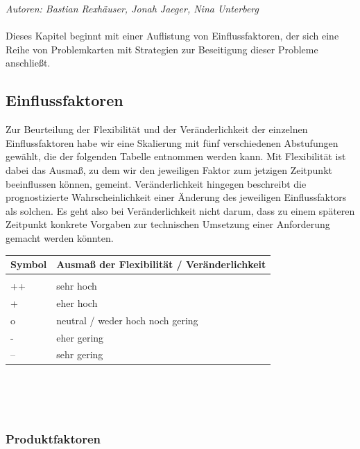 \documentclass[enabledeprecatedfontcommands,fontsize=11pt,paper=a4,twoside]{scrartcl}
\newcounter{one}
\begin{document}
	\emph{Autoren: Bastian Rexhäuser, Jonah Jaeger, Nina Unterberg}\\ \\
	Dieses Kapitel beginnt mit einer Auflistung von Einflussfaktoren, der sich eine Reihe von Problemkarten mit Strategien zur Beseitigung dieser Probleme anschließt.
	\subsection{Einflussfaktoren}
	\label{sec:einflussfaktoren}
	
	Zur Beurteilung der Flexibilität und der Veränderlichkeit der einzelnen Einflussfaktoren habe wir eine Skalierung mit fünf verschiedenen Abstufungen gewählt, die der folgenden Tabelle entnommen werden kann. Mit Flexibilität ist dabei das Ausmaß, zu dem wir den jeweiligen Faktor zum jetzigen Zeitpunkt beeinflussen können, gemeint. Veränderlichkeit hingegen beschreibt die prognostizierte Wahrscheinlichkeit einer Änderung des jeweiligen Einflussfaktors als solchen. Es geht also bei Veränderlichkeit nicht darum, dass zu einem späteren Zeitpunkt konkrete Vorgaben zur technischen Umsetzung einer Anforderung gemacht werden könnten. \\
	
	\begin{tabular}{p{2cm}p{8cm}}
		Symbol & Ausmaß der Flexibilität / Veränderlichkeit \\ \hline \\
		++ & sehr hoch \\ 
		+ & eher hoch \\ 
		o & neutral / weder hoch noch gering \\ 
		- & eher gering \\ 
		-- & sehr gering \\ 
	\end{tabular}\\ \\ \\
	
	
	
	
	\newpage
	\def\arraystretch{1.5}
	\subsubsection{Produktfaktoren}
	\setcounter{one}{1}
\end{document}
